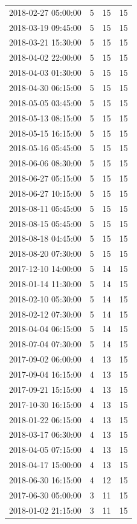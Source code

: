 \begin{tabular}{lrrr}
2018-02-27 05:00:00 & 5 & 15 & 15 \\
2018-03-19 09:45:00 & 5 & 15 & 15 \\
2018-03-21 15:30:00 & 5 & 15 & 15 \\
2018-04-02 22:00:00 & 5 & 15 & 15 \\
2018-04-03 01:30:00 & 5 & 15 & 15 \\
2018-04-30 06:15:00 & 5 & 15 & 15 \\
2018-05-05 03:45:00 & 5 & 15 & 15 \\
2018-05-13 08:15:00 & 5 & 15 & 15 \\
2018-05-15 16:15:00 & 5 & 15 & 15 \\
2018-05-16 05:45:00 & 5 & 15 & 15 \\
2018-06-06 08:30:00 & 5 & 15 & 15 \\
2018-06-27 05:15:00 & 5 & 15 & 15 \\
2018-06-27 10:15:00 & 5 & 15 & 15 \\
2018-08-11 05:45:00 & 5 & 15 & 15 \\
2018-08-15 05:45:00 & 5 & 15 & 15 \\
2018-08-18 04:45:00 & 5 & 15 & 15 \\
2018-08-20 07:30:00 & 5 & 15 & 15 \\
2017-12-10 14:00:00 & 5 & 14 & 15 \\
2018-01-14 11:30:00 & 5 & 14 & 15 \\
2018-02-10 05:30:00 & 5 & 14 & 15 \\
2018-02-12 07:30:00 & 5 & 14 & 15 \\
2018-04-04 06:15:00 & 5 & 14 & 15 \\
2018-07-04 07:30:00 & 5 & 14 & 15 \\
2017-09-02 06:00:00 & 4 & 13 & 15 \\
2017-09-04 16:15:00 & 4 & 13 & 15 \\
2017-09-21 15:15:00 & 4 & 13 & 15 \\
2017-10-30 16:15:00 & 4 & 13 & 15 \\
2018-01-22 06:15:00 & 4 & 13 & 15 \\
2018-03-17 06:30:00 & 4 & 13 & 15 \\
2018-04-05 07:15:00 & 4 & 13 & 15 \\
2018-04-17 15:00:00 & 4 & 13 & 15 \\
2018-06-30 16:15:00 & 4 & 12 & 15 \\
2017-06-30 05:00:00 & 3 & 11 & 15 \\
2018-01-02 21:15:00 & 3 & 11 & 15 \\

\end{tabular}
